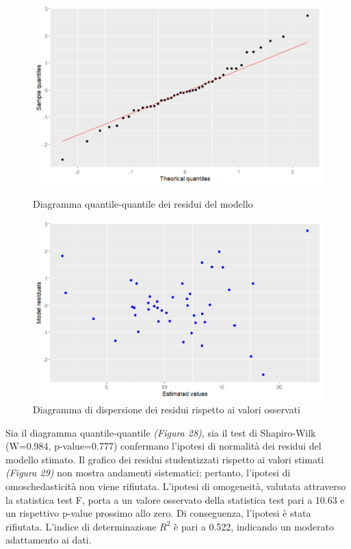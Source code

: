 \documentclass{article} %
\begin{document}
\begin{figure}[H]
    \centering
    \begin{minipage}{0.49\textwidth}
        \centering
        \includegraphics[width=\textwidth]{immagini/qq_lm.png}
        \captionsetup{justification=centering}
        \caption{Diagramma quantile-quantile dei residui del modello}
    \end{minipage}
    \hfill
    \begin{minipage}{0.49\textwidth}
        \centering
        \includegraphics[width=\textwidth]{immagini/res_lm.png}
        \captionsetup{justification=centering}
        \caption{Diagramma di dispersione dei residui rispetto ai valori osservati}
    \end{minipage}
\end{figure}

Sia il diagramma quantile-quantile \textit{(Figura 28)}, sia il test di Shapiro-Wilk (W=0.984, p-value=0.777) confermano l'ipotesi di normalità dei residui del modello stimato. 
Il grafico dei residui studentizzati rispetto ai valori stimati \textit{(Figura 29)} non mostra andamenti sistematici; pertanto, l'ipotesi di omoschedasticità non viene rifiutata. 
L'ipotesi di omogeneità, valutata attraverso la statistica test F, porta a un valore osservato della statistica test pari a 10.63 e un rispettivo p-value prossimo allo zero. Di conseguenza, l'ipotesi è stata rifiutata. 
L'indice di determinazione $R^2$ è pari a 0.522, indicando un moderato adattamento ai dati.
\end{document}
